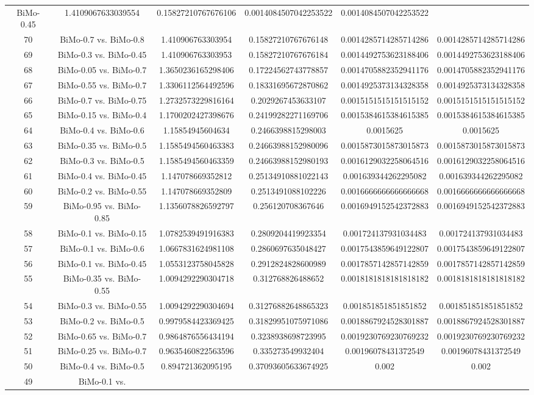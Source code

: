 \documentclass[a4paper,10pt]{article}
\begin{document}
\begin{landscape}
\begin{table}[!htp]
\begin{tabular}{cccccc}
BiMo-0.45&1.4109067633039554&0.15827210767676106&0.0014084507042253522&0.0014084507042253522\\70&BiMo-0.7 vs. BiMo-0.8&1.410906763303954&0.15827210767676148&0.0014285714285714286&0.0014285714285714286\\69&BiMo-0.3 vs. BiMo-0.45&1.410906763303953&0.15827210767676184&0.0014492753623188406&0.0014492753623188406\\68&BiMo-0.05 vs. BiMo-0.7&1.3650236165298406&0.17224562743778857&0.0014705882352941176&0.0014705882352941176\\67&BiMo-0.55 vs. BiMo-0.7&1.3306112564492596&0.18331695672870862&0.0014925373134328358&0.0014925373134328358\\66&BiMo-0.7 vs. BiMo-0.75&1.2732573229816164&0.2029267453633107&0.0015151515151515152&0.0015151515151515152\\65&BiMo-0.15 vs. BiMo-0.4&1.1700202427398676&0.24199282271169706&0.0015384615384615385&0.0015384615384615385\\64&BiMo-0.4 vs. BiMo-0.6&1.15854945604634&0.2466398815298003&0.0015625&0.0015625\\63&BiMo-0.35 vs. BiMo-0.5&1.1585494560463383&0.24663988152980096&0.0015873015873015873&0.0015873015873015873\\62&BiMo-0.3 vs. BiMo-0.5&1.1585494560463359&0.24663988152980193&0.0016129032258064516&0.0016129032258064516\\61&BiMo-0.4 vs. BiMo-0.45&1.147078669352812&0.25134910881022143&0.001639344262295082&0.001639344262295082\\60&BiMo-0.2 vs. BiMo-0.55&1.147078669352809&0.2513491088102226&0.0016666666666666668&0.0016666666666666668\\59&BiMo-0.95 vs. BiMo-0.85&1.1356078826592797&0.256120708367646&0.0016949152542372883&0.0016949152542372883\\58&BiMo-0.1 vs. BiMo-0.15&1.0782539491916383&0.2809204419923354&0.001724137931034483&0.001724137931034483\\57&BiMo-0.1 vs. BiMo-0.6&1.0667831624981108&0.2860697635048427&0.0017543859649122807&0.0017543859649122807\\56&BiMo-0.1 vs. BiMo-0.45&1.0553123758045828&0.2912824828600989&0.0017857142857142859&0.0017857142857142859\\55&BiMo-0.35 vs. BiMo-0.55&1.0094292290304718&0.312768826488652&0.0018181818181818182&0.0018181818181818182\\54&BiMo-0.3 vs. BiMo-0.55&1.0094292290304694&0.31276882648865323&0.001851851851851852&0.001851851851851852\\53&BiMo-0.2 vs. BiMo-0.5&0.9979584423369425&0.31829951075971086&0.0018867924528301887&0.0018867924528301887\\52&BiMo-0.65 vs. BiMo-0.7&0.9864876556434194&0.3238938698723995&0.0019230769230769232&0.0019230769230769232\\51&BiMo-0.25 vs. BiMo-0.7&0.9635460822563596&0.335273549932404&0.00196078431372549&0.00196078431372549\\50&BiMo-0.4 vs. BiMo-0.5&0.894721362095195&0.37093605633674925&0.002&0.002\\49&BiMo-0.1 vs. 
\end{tabular}
\end{table}
\end{landscape}
\end{document}
